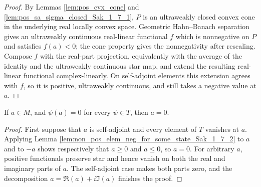 \begin{proof}
  \leanok
  By Lemmas \ref{lem:pos_cvx_cone} and \ref{lem:pos_sa_sigma_closed_Sak_1_7_1}, $P$ is an
  ultraweakly closed convex cone in the underlying real locally convex space. Geometric
  Hahn--Banach separation gives an ultraweakly continuous real-linear functional $f$ which is
  nonnegative on $P$ and satisfies $f(a)<0$; the cone property gives the nonnegativity after
  rescaling. Compose $f$ with the real-part projection, equivalently with the average of the
  identity and the ultraweakly continuous star map, and extend the resulting real-linear
  functional complex-linearly. On self-adjoint elements this extension agrees with $f$, so it is
  positive, ultraweakly continuous, and still takes a negative value at $a$.
\end{proof}

\begin{lemma}
  \label{lem:uw_pos_sep_pts}
  \leanok
If $a\in M$, and $\psi(a)=0$ for every $\psi\in T$, then $a=0$.
\end{lemma}

\begin{proof}
  \leanok
  First suppose that $a$ is self-adjoint and every element of $T$ vanishes at $a$. Applying Lemma
  \ref{lem:non_pos_elem_neg_for_some_state_Sak_1_7_2} to $a$ and to $-a$ shows respectively that
  $a\ge0$ and $a\le0$, so $a=0$. For arbitrary $a$, positive functionals preserve star and hence
  vanish on both the real and imaginary parts of $a$. The self-adjoint case makes both parts zero,
  and the decomposition $a=\Re(a)+i\Im(a)$ finishes the proof.
\end{proof}
